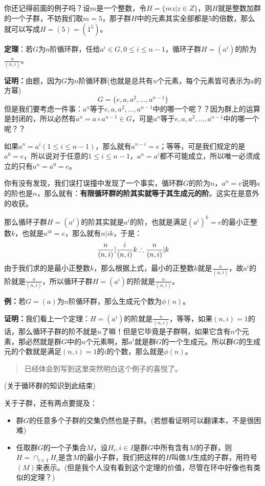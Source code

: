 \documentclass[12pt, a4paper, oneside]{ctexart}
\newenvironment{myquote}{\begin{quote}\small\color{gray}}{\end{quote}}
\begin{document}
你还记得前面的例子吗？设$m$是一个整数，令$H=\{mz|z\in Z\}$，则$H$就是整数加群的一个子群，不妨我们取$m=5$，那子群$H$中的元素其实全部都是5的倍数，那么就可以写成$H=(5)=(1^5)$。

\textbf{定理}：若$G$为$n$阶循环群，任给$a^i\in G,0\leqslant i\leqslant n-1$，循环子群$H=(a^i)$的阶为$\frac{n}{(n,i)}$。

\textbf{证明：}由题，因为$G$为$n$阶循环群(也就是总共有$n$个元素，每个元素皆可表示为$a$的方幂)
\[
G=\{e,a,a^2,...,a^{n-1}\}
\]
但是我们要考虑一件事：$a^n$等于$e,a,a^2,...,a^{n-1}$中的哪一个呢？？因为群上的运算是封闭的，所以必然有$a^n=a\circ a^{n-1}\in G$，可是$a^n$等于$e,a,a^2,...,a^{n-1}$中的哪一个呢？？

如果$a^n=a^i(1\leqslant i\leqslant n-1)$，那么就有$a^{n-i}=e$；等等，可是我们规定的是$a^0=e$，所以说对于任意的$1\leqslant i\leqslant n-1$，$a^n=a^i$都不可能成立，所以唯一必须成立的只有$a^n=a^0=e$。

你有没有发现，我们误打误撞中发现了一个事实，循环群$G$的阶为$n$，$a^n=e$说明$a$的阶也是$n$，那么就有：\textbf{有限循环群的阶其实就等于其生成元的阶}。这实在是意外的收获。

那么循环子群$H=(a^i)$的阶其实就是$a^i$的阶，也就是满足$(a^i)^k=e$的最小正整数$k$，也就是$a^{ik}=e$，那么就有$n|ik$，于是：
\[
\frac{n}{(n,i)}|\frac{i}{(n,i)}k\\
\therefore \frac{n}{(n,i)}|k
\]
由于我们求的是最小正整数$k$，那么根据上式，最小的正整数$k$就是$\frac{n}{(n,i)}$，故$a^i$的阶就是$\frac{n}{(n,i)}$，所以循环子群$H=(a^i)$的阶就是$\frac{n}{(n,i)}$。

\textbf{例：}若$G=(a)$为$n$阶循环群，那么生成元个数为$\phi(n)$。

\textbf{证明：}我们看上一个定理：$H=(a^i)$的阶就是$\frac{n}{(n,i)}$，等等，如果$(n,i)=1$的话，那么循环子群的阶不就是$n$了嘛！但是它毕竟是子群啊，如果它含有$n$个元素，那必然就是群$G$中的$n$个元素啊，那$a^i$就是群$G$的一个生成元。所以群$G$的生成元的个数就是满足$(n,i)=1$的$i$的个数，那么就是$\phi(n)$。

\begin{myquote}
已经体会到写到这里突然明白这个例子的喜悦了。
\end{myquote}

(关于循环群的知识到此结束)

关于子群，还有两点要提及：

\begin{itemize}[leftmargin=*]
\item 群$G$的任意多个子群的交集仍然也是子群。(若想看证明可以翻课本，不是很困难)
\item 任取群$G$的一个子集合$M$，设$H_i,i\in I$是群$G$中所有含有$M$的子群，则$H=\cap_{i\in I}H_i$是含$M$的最小子群，我们把这样的$H$叫做$M$生成的子群，用符号$(M)$来表示。(但是我个人没有看到这个定理的价值，尽管在环中好像也有类似的定理？)
\end{itemize}
\end{document}
